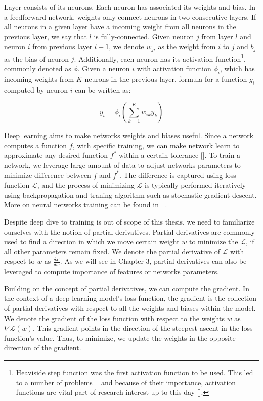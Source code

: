 Layer consists of its neurons. Each neuron has associated its weights and bias. In a feedforward network, weights only connect neurons in two consecutive layers. If all neurons in a given layer have a incoming weight from all neurons in the previous layer, we say that $l$ is fully-connected. Given neuron $j$ from layer $l$ and neuron $i$ from previous layer $l - 1$, we denote $w_{ji}$ as the weight from $i$ to $j$ and $b_j$ as the bias of neuron $j$. Additionally, each neuron has its activation function\footnote{Heaviside step function was the first activation function to be used. This led to a number of problems [] and because of their importance, activation functions are vital part of research interest up to this day [].}, commonly denoted as $\phi$. Given a neuron $i$ with activation function $\phi_i$, which has incoming weights from $K$ neurons in the previous layer, formula for a function $g_i$ computed by neuron $i$ can be written as:

\begin{equation}
y_i = \phi_i(\sum_{k=1}^K w_{ik}y_k)
\end{equation}

Deep learning aims to make networks weights and biases useful. Since a network computes a function $f$, with specific training, we can make network learn to approximate any desired function $f^*$ within a certain tolerance []. To train a network, we leverage large amount of data to adjust networks parameters to minimize difference between $f$ and $f^*$. The difference is captured using loss function $\mathcal{L}$, and the process of minimizing $\mathcal{L}$ is typically performed iteratively using backpropagation and traning algorithm such as stochastic gradient descent. More on neural networks training can be found in []. 

Despite deep dive to training is out of scope of this thesis, we need to familiarize ourselves with the notion of partial derivatives. Partial derivatives are commonly used to find a direction in which we move certain weight $w$ to minimize the $\mathcal{L}$, if all other parameters remain fixed. We denote the partial derivative of $\mathcal{L}$ with respect to $w$ as $\frac{\delta \mathcal{L}}{\delta w}$. As we will see in Chapter 3, partial derivatives can also be leveraged to compute importance of features or networks parameters.

Building on the concept of partial derivatives, we can compute the gradient. In the context of a deep learning model's loss function, the gradient is the collection of partial derivatives with respect to all the weights and biases within the model. We denote the gradient of the loss function with respect to the weights $w$ as $\nabla\mathcal{L}(w)$. This gradient points in the direction of the steepest ascent in the loss function's value. Thus, to minimize, we update the weights in the opposite direction of the gradient.

